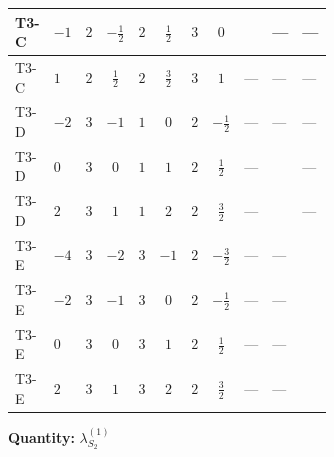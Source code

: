 \documentclass[8pt]{article}
\begin{document}
\begin{landscape}
\begin{longtable}{@{}llcccccc >{\raggedright\arraybackslash}p{0.21\linewidth} >{\raggedright\arraybackslash}p{0.21\linewidth} >{\raggedright\arraybackslash}p{0.21\linewidth}@{}}
\midrule
T3-C & $-1$ & $2$ & $-\frac{1}{2}$ & $2$ & $\frac{1}{2}$ & $3$ & $0$ & \scriptsize\adjustbox{max width=\linewidth}{$\begin{gathered} +24 {\lambda_{10}} \left({\lambda_{10}}\right)^{*}\end{gathered}$} & --- & --- \\
\midrule
T3-C & $1$ & $2$ & $\frac{1}{2}$ & $2$ & $\frac{3}{2}$ & $3$ & $1$ & --- & --- & --- \\
\midrule
T3-D & $-2$ & $3$ & $-1$ & $1$ & $0$ & $2$ & $-\frac{1}{2}$ & --- & --- & --- \\
\midrule
T3-D & $0$ & $3$ & $0$ & $1$ & $1$ & $2$ & $\frac{1}{2}$ & --- & \scriptsize\adjustbox{max width=\linewidth}{$\begin{gathered} -12 {g_1}^2 {\lambda_{S_2}^{(1)}}\end{gathered}$} & --- \\
\midrule
T3-D & $2$ & $3$ & $1$ & $1$ & $2$ & $2$ & $\frac{3}{2}$ & --- & \scriptsize\adjustbox{max width=\linewidth}{$\begin{gathered} -48 {g_1}^2 {\lambda_{S_2}^{(1)}}\end{gathered}$} & --- \\
\midrule
T3-E & $-4$ & $3$ & $-2$ & $3$ & $-1$ & $2$ & $-\frac{3}{2}$ & --- & --- & \scriptsize\adjustbox{max width=\linewidth}{$\begin{gathered} +8 {\lambda_{12}^{(1)}} {\lambda_{12}^{(\times)}}\end{gathered}$} \\
\midrule
T3-E & $-2$ & $3$ & $-1$ & $3$ & $0$ & $2$ & $-\frac{1}{2}$ & --- & --- & \scriptsize\adjustbox{max width=\linewidth}{$\begin{gathered} +8 {\lambda_{12}^{(1)}} {\lambda_{12}^{(\times)}}\end{gathered}$} \\
\midrule
T3-E & $0$ & $3$ & $0$ & $3$ & $1$ & $2$ & $\frac{1}{2}$ & --- & --- & \scriptsize\adjustbox{max width=\linewidth}{$\begin{gathered} +8 {\lambda_{12}^{(1)}} {\lambda_{12}^{(\times)}}\end{gathered}$} \\
\midrule
T3-E & $2$ & $3$ & $1$ & $3$ & $2$ & $2$ & $\frac{3}{2}$ & --- & --- & \scriptsize\adjustbox{max width=\linewidth}{$\begin{gathered} +8 {\lambda_{12}^{(1)}} {\lambda_{12}^{(\times)}}\end{gathered}$} \\
\midrule
\bottomrule
\end{longtable}
\clearpage
\noindent\textbf{Quantity: }$\lambda_{S_2}^{(1)}$\par\smallskip

\end{landscape}
\end{document}
